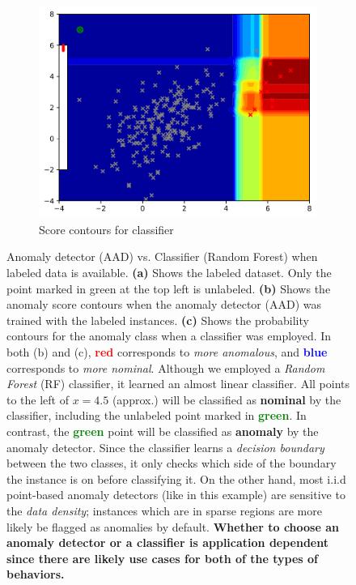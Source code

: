 \documentclass{article} %
\begin{document}
\begin{figure}
\begin{subfigure}[b]{0.3\textwidth}
    	\includegraphics[width=\textwidth, clip=true, trim=0mm 0mm 0mm 0mm]{avc_train_classifier}
    	\caption{Score contours for classifier}
    	\label{fig:rf}
    \end{subfigure}
	\caption{Anomaly detector (AAD) vs. Classifier (Random Forest) when labeled data is available. {\bf (a)} Shows the labeled dataset. Only the point marked in green at the top left is unlabeled. {\bf (b)} Shows the anomaly score contours when the anomaly detector (AAD) was trained with the labeled instances. {\bf (c)} Shows the probability contours for the anomaly class when a classifier was employed. In both (b) and (c), \textcolor{red}{\textbf{red}} corresponds to \textit{more anomalous}, and \textcolor{blue}{\textbf{blue}} corresponds to \textit{more nominal}. Although we employed a \textit{Random Forest} (RF) classifier, it learned an almost linear classifier. All points to the left of $x=4.5$ (approx.) will be classified as \textbf{nominal} by the classifier, including the unlabeled point marked in \textcolor{green}{\textbf{green}}. In contrast, the \textcolor{green}{\textbf{green}} point will be classified as \textbf{anomaly} by the anomaly detector. Since the classifier learns a \textit{decision boundary} between the two classes, it only checks which side of the boundary the instance is on before classifying it. On the other hand, most i.i.d point-based anomaly detectors (like in this example) are sensitive to the \textit{data density}; instances which are in sparse regions are more likely be flagged as anomalies by default. \textbf{Whether to choose an anomaly detector or a classifier is application dependent since there are likely use cases for both of the types of behaviors.}}
	\label{fig:regression}
\end{figure}
\end{document}
